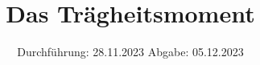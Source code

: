 

\subject{V101}
\title{Das Trägheitsmoment}
\date{%
  Durchführung: 28.11.2023
  \hspace{3em}
  Abgabe: 05.12.2023
}



\maketitle
\thispagestyle{empty}
\tableofcontents
\newpage








\printbibliography{}

